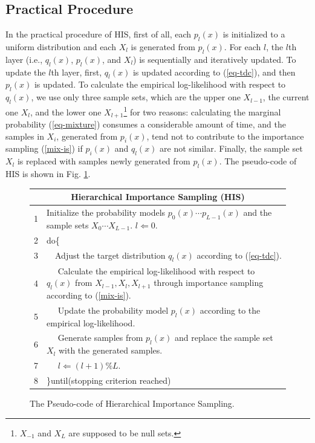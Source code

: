 \subsection{Practical Procedure}
In the practical procedure of HIS,
first of all, each $p_l(x)$
is initialized to a uniform distribution and
each $X_l$ is generated from $p_l(x)$.
For each $l$, the $l$th layer (i.e., $q_l(x)$, $p_l(x)$, and $X_l$) is
sequentially and iteratively updated.
To update the $l$th layer,
first, $q_l(x)$ is updated according to (\ref{eq-tdc}),
and then $p_l(x)$ is updated.
To calculate the empirical log-likelihood with respect to $q_l(x)$,
we use only three sample sets, which are the upper one $X_{l-1}$,
the current one $X_l$, and the lower one $X_{l+1}$\footnote{$X_{-1}$ and
$X_L$ are supposed to be null sets.}
for two reasons:
calculating the marginal probability (\ref{eq-mixture}) consumes a
considerable amount of time, and
the samples in $X_i$, generated from $p_i(x)$, tend not to contribute
to the importance sampling (\ref{mix-is})
if $p_i(x)$ and $q_l(x)$ are not similar.
Finally, the sample set $X_l$ is replaced with
samples newly generated from $p_l(x)$.
The pseudo-code of HIS
is shown in Fig. \ref{his-algo}.

\begin{figure}[t]
\renewcommand{\arraystretch}{1.23}
\centering
\begin{tabular}{lp{.9\linewidth}}
\multicolumn{2}{c}{Hierarchical Importance Sampling (HIS)}\\
\hline
1 & Initialize the probability models $p_0(x) \cdots p_{L-1}(x)$ and
the sample sets $X_0 \cdots X_{L-1}$.
$l \Leftarrow 0$.
\\
2 & do\{ \\
3 & ~~Adjust the target distribution $q_l(x)$ according to (\ref{eq-tdc}).\\
4 & ~~ \parbox[t]{.85\linewidth}{Calculate the empirical log-likelihood with
 respect to $q_l(x)$ from
 $X_{l-1},X_l,X_{l+1}$ through importance sampling according to (\ref{mix-is}).} \\
5 & ~~ \parbox[t]{.85\linewidth}{Update the probability model $p_l(x)$ according to
 the empirical log-likelihood.}\\
6 & ~~ \parbox[t]{.85\linewidth}{Generate samples from $p_l(x)$ and replace
the sample set $X_l$ with the generated samples.}\\
7 & ~~ $l \Leftarrow (l+1)\%L$.\\
8 & \}until(stopping criterion reached)\\
\hline
\end{tabular}
\vspace{3mm}
\caption{The Pseudo-code of Hierarchical Importance Sampling.}
\label{his-algo}
\end{figure}



